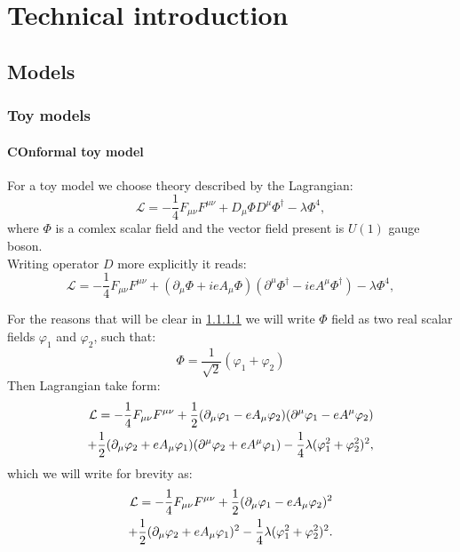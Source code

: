 \chapter{Technical introduction}
\section{Models}
\subsection{Toy models}
\subsubsection{COnformal toy model}
For a toy model we choose theory described by the Lagrangian:
\begin{equation}
\mathcal{L} = -\frac{1}{4}F_{\mu\nu}F^{\mu\nu}+D_\mu\Phi D^\mu\Phi^\dag-\lambda\Phi^4,
\end{equation}
where $\Phi$ is a comlex scalar field and the vector field present is $U(1)$ gauge boson. \\


Writing operator $D$ more explicitly it reads:
\begin{equation}
\mathcal{L} = -\frac{1}{4}F_{\mu\nu}F^{\mu\nu}+(\partial_\mu\Phi + ieA_\mu\Phi) 
(\partial^\mu\Phi^\dag-ieA^\mu\Phi^\dag)-\lambda\Phi^4,
\end{equation}

For the reasons that will be clear in \ref{} we will write $\Phi$ field as two real scalar fields 
$\varphi_1$ and $\varphi_2$, such that:
\begin{equation}
\Phi = \frac{1}{\sqrt{2}}(\varphi_1+\varphi_2)
\end{equation}
Then Lagrangian take form:
\begin{align}
\mathcal{L} = -\frac{1}{4}F_{\mu\nu}F^{\mu\nu}+ \frac{1}{2}(\partial_\mu\varphi_1 - eA_\mu\varphi_2)
(\partial^\mu\varphi_1 - eA^\mu\varphi_2)  \\
+\frac{1}{2}(\partial_\mu\varphi_2+eA_\mu\varphi_1)(\partial^\mu\varphi_2+eA^\mu\varphi_1) 
-\frac{1}{4}\lambda(\varphi_1^2+\varphi_2^2)^2,\notag
\end{align}
which we will write for brevity as:
\begin{align}
\mathcal{L} = -\frac{1}{4}F_{\mu\nu}F^{\mu\nu}+ 
\frac{1}{2}(\partial_\mu\varphi_1 - eA_\mu\varphi_2)^2\\
+\frac{1}{2}(\partial_\mu\varphi_2+eA_\mu\varphi_1)^2
-\frac{1}{4}\lambda(\varphi_1^2+\varphi_2^2)^2. \notag
\end{align}

